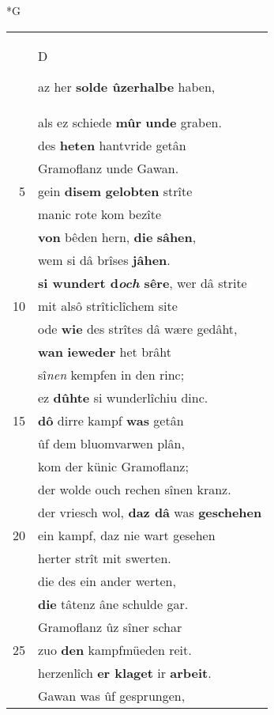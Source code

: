 \documentclass[8pt,a4paper,notitlepage]{article}
\begin{document}
\newpage
\begin{table}[ht]
\begin{minipage}[t]{0.5\linewidth}
\small
\begin{center}*G
\end{center}
\begin{tabular}{rl}
 & \begin{large}D\end{large}az her \textbf{solde ûzerhalbe} haben,\\ 
 & als ez schiede \textbf{mûr} \textbf{unde} graben.\\ 
 & des \textbf{heten} hantvride getân\\ 
 & Gramoflanz unde Gawan.\\ 
5 & gein \textbf{disem} \textbf{gelobten} strîte\\ 
 & manic rote kom bezîte\\ 
 & \textbf{von} bêden hern, \textbf{die} \textbf{sâhen},\\ 
 & wem si dâ brîses \textbf{jâhen}.\\ 
 & \textbf{si wundert d\textit{och} sêre}, wer dâ strite\\ 
10 & mit alsô strîticlîchem site\\ 
 & ode \textbf{wie} des strîtes dâ wære gedâht,\\ 
 & \textbf{wan} \textbf{ieweder} het brâht\\ 
 & sî\textit{nen} kempfen in den rinc;\\ 
 & ez \textbf{dûhte} si wunderlîchiu dinc.\\ 
15 & \textbf{dô} dirre kampf \textbf{was} getân\\ 
 & ûf dem bluomvarwen plân,\\ 
 & kom der künic Gramoflanz;\\ 
 & der wolde ouch rechen sînen kranz.\\ 
 & der vriesch wol, \textbf{daz dâ} was \textbf{geschehen}\\ 
20 & ein kampf, daz nie wart gesehen\\ 
 & herter strît mit swerten.\\ 
 & die des ein ander werten,\\ 
 & \textbf{die} tâtenz âne schulde gar.\\ 
 & Gramoflanz ûz sîner schar\\ 
25 & zuo \textbf{den} kampfmüeden reit.\\ 
 & herzenlîch \textbf{er klaget} ir \textbf{arbeit}.\\ 
 & Gawan was ûf gesprungen,\\ 

\end{tabular}
\end{minipage}
\end{table}
\end{document}
